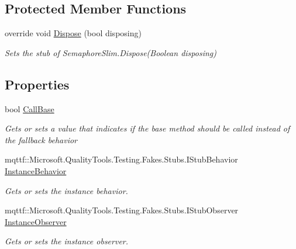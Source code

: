 \subsection*{Protected Member Functions}
\begin{DoxyCompactItemize}
\item 
override void \hyperlink{class_system_1_1_threading_1_1_fakes_1_1_stub_semaphore_slim_a1103855b5d3c72bdfef44f82f9669bca}{Dispose} (bool disposing)
\begin{DoxyCompactList}\small\item\em Sets the stub of Semaphore\-Slim.\-Dispose(\-Boolean disposing)\end{DoxyCompactList}\end{DoxyCompactItemize}
\subsection*{Properties}
\begin{DoxyCompactItemize}
\item 
bool \hyperlink{class_system_1_1_threading_1_1_fakes_1_1_stub_semaphore_slim_a6e5c263badc5b89c71ba3e836cdbee62}{Call\-Base}
\begin{DoxyCompactList}\small\item\em Gets or sets a value that indicates if the base method should be called instead of the fallback behavior\end{DoxyCompactList}\item 
mqttf\-::\-Microsoft.\-Quality\-Tools.\-Testing.\-Fakes.\-Stubs.\-I\-Stub\-Behavior \hyperlink{class_system_1_1_threading_1_1_fakes_1_1_stub_semaphore_slim_af696848a443d6be27f81f682e8a6b542}{Instance\-Behavior}
\begin{DoxyCompactList}\small\item\em Gets or sets the instance behavior.\end{DoxyCompactList}\item 
mqttf\-::\-Microsoft.\-Quality\-Tools.\-Testing.\-Fakes.\-Stubs.\-I\-Stub\-Observer \hyperlink{class_system_1_1_threading_1_1_fakes_1_1_stub_semaphore_slim_a448a4d7b7d9faaee432d5c66c5afc89e}{Instance\-Observer}
\begin{DoxyCompactList}\small\item\em Gets or sets the instance observer.\end{DoxyCompactList}\end{DoxyCompactItemize}



